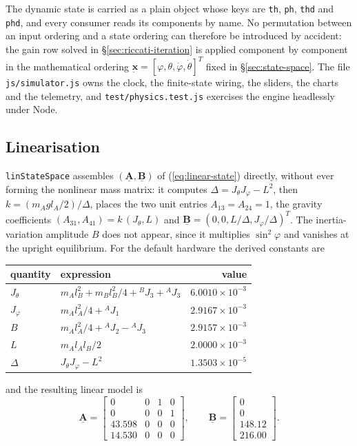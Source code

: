 \documentclass[12pt]{article}
\newcommand{\vb}[1]{{\underset{\tilde{}}{\mathbf{#1}}}}
\newcommand{\mb}[1]{\underline{\mathbf{#1}}}
\begin{document}
The dynamic state is carried as a plain object whose keys are \texttt{th}, \texttt{ph}, \texttt{thd} and \texttt{phd}, and every consumer reads its components by name. No permutation between an input ordering and a state ordering can therefore be introduced by accident: the gain row solved in \S\ref{sec:riccati-iteration} is applied component by component in the mathematical ordering $\vb{x} = [\varphi, \theta, \dot{\varphi}, \dot{\theta}]^T$ fixed in \S\ref{sec:state-space}. The file \texttt{js/simulator.js} owns the clock, the finite-state wiring, the sliders, the charts and the telemetry, and \texttt{test/physics.test.js} exercises the engine headlessly under Node.

\subsection{Linearisation}
\label{sec:linearisation}

\texttt{linStateSpace} assembles $(\mb{A},\mb{B})$ of (\ref{eq:linear-state}) directly, without ever forming the nonlinear mass matrix: it computes $\Delta = J_\theta J_\varphi - L^2$, then $k = (m_A g l_A / 2)/\Delta$, places the two unit entries $A_{13} = A_{24} = 1$, the gravity coefficients $(A_{31}, A_{41}) = k\,(J_\theta, L)$ and $\mb{B} = (0, 0, L/\Delta, J_\varphi/\Delta)^T$. The inertia-variation amplitude $B$ does not appear, since it multiplies $\sin^2\varphi$ and vanishes at the upright equilibrium. For the default hardware the derived constants are

\begin{center}
\begin{tabular}{l l r}
\hline
quantity & expression & value \\
\hline
$J_\theta$ & $m_A l_B^2 + m_B l_B^2/4 + {}^B J_3 + {}^A J_3$ & $6.0010 \times 10^{-3}$ \\
$J_\varphi$ & $m_A l_A^2/4 + {}^A J_1$ & $2.9167 \times 10^{-3}$ \\
$B$ & $m_A l_A^2/4 + {}^A J_2 - {}^A J_3$ & $2.9157 \times 10^{-3}$ \\
$L$ & $m_A l_A l_B / 2$ & $2.0000 \times 10^{-3}$ \\
$\Delta$ & $J_\theta J_\varphi - L^2$ & $1.3503 \times 10^{-5}$ \\
\hline
\end{tabular}
\end{center}

 and the resulting linear model is
\[
\mb{A} = \begin{bmatrix} 0 & 0 & 1 & 0 \\ 0 & 0 & 0 & 1 \\ 43.598 & 0 & 0 & 0 \\ 14.530 & 0 & 0 & 0 \end{bmatrix},
\qquad
\mb{B} = \begin{bmatrix} 0 \\ 0 \\ 148.12 \\ 216.00 \end{bmatrix}.
\]
\end{document}
